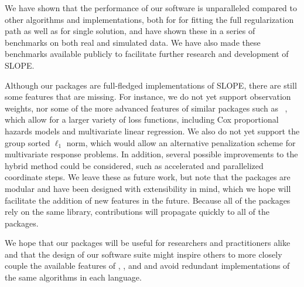 \documentclass[article]{jss}
\begin{document}
We have shown that the performance of our software is unparalleled
compared to other algorithms and implementations, both for for fitting
the full regularization path as well as for single solution, and
have shown these in a series of benchmarks on both real and simulated
data. We have also made these benchmarks available publicly
to facilitate further research and development of SLOPE.

Although our packages are full-fledged implementations of SLOPE, there are
still some features that are missing. For instance, we do not yet support
observation weights, nor some of the more advanced features of similar packages
such as ~\citep{friedman2010}, which allow for a larger variety of
loss functions, including Cox proportional hazards models and multivariate
linear regression. We also do not yet support the group sorted \(\ell_1\) norm,
which would allow an alternative penalization scheme for multivariate response
problems. In addition, several possible improvements to the hybrid method
could be considered, such as accelerated and parallelized coordinate
steps. We leave these as future work, but note that
the packages are modular and have been designed with extensibility in mind,
which we hope will facilitate the addition of new features in the future.
Because all of the packages rely on the same  library, contributions
will propagate quickly to all of the packages.

We hope that our packages will be useful for researchers and
practitioners alike and that the design of our software suite
might inspire others to more closely couple the available features
of , , and  and avoid
redundant implementations of the same algorithms in each language.



\newpage
\end{document}
